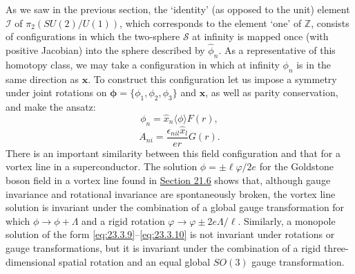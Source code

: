 As we saw in the previous section, the `identity' (as opposed to the unit)
element $\mathcal I$ of $\pi_2(SU(2)/U(1))$, which corresponds to the
element `one' of $\mathbb Z$, consists of configurations in which the
two-sphere $\mathcal S$ at infinity is mapped once (with positive
Jacobian) into the sphere described by $\hat\phi_n$. As a representative
of this homotopy class, we may take a configuration in which at infinity
$\phi_n$ is in the same direction as $\mathbf x$. To construct this
configuration let us impose a symmetry under joint rotations on
$\boldsymbol\phi=\{\phi_1,\phi_2,\phi_3\}$ and $\mathbf x$, as well as
parity conservation, and make the ansatz:
\begin{equation}
 \phi_n=\hat x_n\langle\phi\rangle F(r),
 \tag{23.3.9}\label{eq:23.3.9}
\end{equation}
\begin{equation}
 A_{ni}=\frac{\epsilon_{nil}\hat x_l}{er}G(r).
 \tag{23.3.10}\label{eq:23.3.10}
\end{equation}
There is an important similarity between this field configuration and
that for a vortex line in a superconductor. The solution
$\phi=\pm\ell\varphi/2e$ for the Goldstone boson field in a vortex line
found in \hyperref[sec:21.6]{Section 21.6} shows that, although gauge
invariance and rotational invariance are spontaneously broken, the vortex
line solution is invariant under the combination of a global gauge
transformation for which $\phi\to\phi+\Lambda$ and a rigid rotation
$\varphi\to\varphi\pm2e\Lambda/\ell$. Similarly, a monopole solution of
the form \eqref{eq:23.3.9}--\eqref{eq:23.3.10} is not invariant under
rotations or gauge transformations, but it is invariant under the
combination of a rigid three-dimensional spatial rotation and an equal
global $SO(3)$ gauge transformation.

